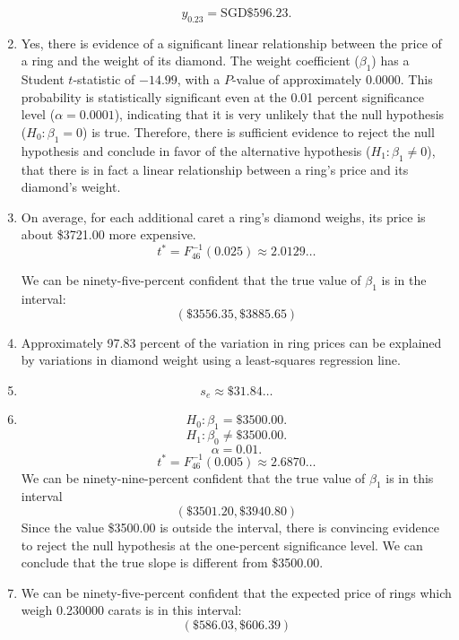 \documentclass[12pt]{article}
\begin{document}
\begin{enumerate}
\[y_{0.23}=\text{SGD}\$596.23.\]
\item Yes, there is evidence of a significant linear relationship between the price of a ring and the weight of its diamond. The weight coefficient ($\beta_1$) has a Student $t$-statistic of $-14.99$, with a $P$-value of approximately 0.0000. This probability is statistically significant even at the 0.01 percent significance level ($\alpha=0.0001$), indicating that it is very unlikely that the null hypothesis ($H_0:\beta_1=0$) is true. Therefore, there is sufficient evidence to reject the null hypothesis and conclude in favor of the alternative hypothesis ($H_1:\beta_1\neq 0$), that there is in fact a linear relationship between a ring's price and its diamond's weight.
\item On average, for each additional caret a ring's diamond weighs, its price is about \$3721.00 more expensive.
\[t^*=F^{-1}_{46}(0.025)\approx 2.0129\dots\]

We can be ninety-five-percent confident that the true value of $\beta_1$ is in the interval:
\[(\$3556.35,\$3885.65)\]
\item Approximately 97.83 percent of the variation in ring prices can be explained by variations in diamond weight using a least-squares regression line.
\item\[s_e\approx\$31.84\dots\]
\item\[H_0:\beta_1=\$3500.00.\]
\[H_1:\beta_0\neq\$3500.00.\]
\[\alpha=0.01.\]
\[t^*=F^{-1}_{46}(0.005)\approx 2.6870\dots\]
We can be ninety-nine-percent confident that the true value of $\beta_1$ is in this interval
\[(\$3501.20,\$3940.80)\]
Since the value \$3500.00 is outside the interval, there is convincing evidence to reject the null hypothesis at the one-percent significance level. We can conclude that the true slope is different from \$3500.00.
\item We can be ninety-five-percent confident that the expected price of rings which weigh 0.230000 carats is in this interval:
\[(\$586.03,\$606.39)\]
\end{enumerate}
\end{document}
